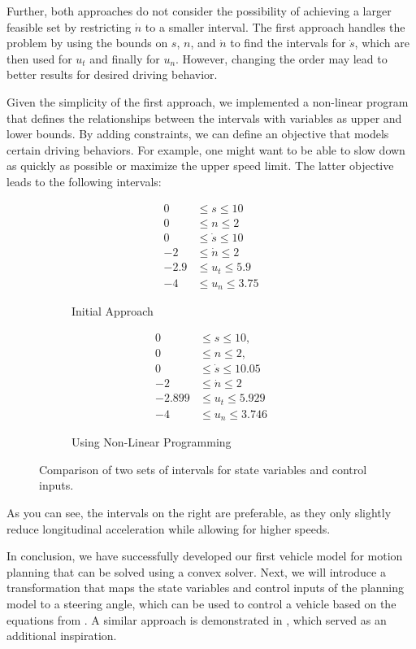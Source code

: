 Further, both approaches do not consider the possibility of achieving a larger feasible set by restricting $\dot{n}$ to a smaller interval.
The first approach handles the problem by using the bounds on $s$, $n$, and $\dot{n}$ to find the intervals for $\dot{s}$, which are then used for
$u_t$ and finally for $u_n$.
However, changing the order may lead to better results for desired driving behavior.

Given the simplicity of the first approach, we implemented a non-linear program that defines the relationships between the intervals with variables
as upper and lower bounds.
By adding constraints, we can define an objective that models certain driving behaviors.
For example, one might want to be able to slow down as quickly as possible or maximize the upper speed limit.
The latter objective leads to the following intervals:

\begin{figure}[h]
	\centering
	\begin{subfigure}[b]{0.45\textwidth}
		\centering
		\begin{align*}
			0    & \leq s \leq 10       \\
			0    & \leq n \leq 2        \\
			0    & \leq \dot{s} \leq 10 \\
			-2   & \leq \dot{n} \leq 2  \\
			-2.9 & \leq u_t \leq 5.9    \\
			-4   & \leq u_n \leq 3.75
		\end{align*}
		\caption{Initial Approach}
	\end{subfigure}
	\hfill
	\begin{subfigure}[b]{0.45\textwidth}
		\centering
		\begin{align*}
			0      & \leq s \leq 10,         \\
			0      & \leq n \leq 2,          \\
			0      & \leq \dot{s} \leq 10.05 \\
			-2     & \leq \dot{n} \leq 2     \\
			-2.899 & \leq u_t \leq 5.929     \\
			-4     & \leq u_n \leq 3.746
		\end{align*}
		\caption{Using Non-Linear Programming}
	\end{subfigure}
	\caption{Comparison of two sets of intervals for state variables and control inputs.}
\end{figure}

As you can see, the intervals on the right are preferable, as they only slightly reduce longitudinal acceleration while allowing for higher speeds.

In conclusion, we have successfully developed our first vehicle model for motion planning that can be solved using a convex solver.
Next, we will introduce a transformation that maps the state variables and control inputs of the planning model to a steering angle, which can be
used to control a vehicle based on the equations from \cite{eilbrecht_challenges_2020}.
A similar approach is demonstrated in \cite{werling_optimal_2010}, which served as an additional inspiration.
